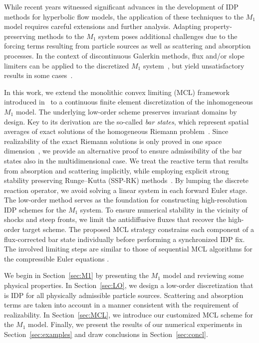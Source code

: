 \documentclass[preprint, 11pt]{elsarticle}
\begin{document}
While recent years witnessed significant advances in the development of IDP methods for hyperbolic flow models, the application of these techniques to the $M_1$ model requires careful extensions and further analysis. 
Adapting property-preserving methods to the $M_1$ system poses
additional challenges due to the forcing terms resulting from particle sources as well as scattering and absorption processes.
In the context of discontinuous Galerkin methods, flux and/or slope limiters
can be applied to the discretized
$M_1$ system~\cite{alldredge2015,chu2019,olbrant2012}, but yield unsatisfactory results in some cases~\cite{chidyagwai2018}.

In this work, we extend the monolithic convex limiting (MCL) framework
introduced in~\cite{kuzmin2020} to a continuous finite element discretization
of the inhomogeneous $M_1$ model. The underlying low-order scheme
preserves invariant domains by design.
Key to its derivation are the so-called \textit{bar states}, which represent spatial averages of exact solutions of the homogeneous Riemann problem~\cite{guermond2016}.
Since realizability of the exact Riemann solutions is only proved in one space dimension~\cite{coulombel2006}, we provide an alternative proof to ensure admissibility of the bar states also in the multidimensional case. 
We treat the reactive term that results from absorption and scattering implicitly, while employing explicit strong stability preserving Runge--Kutta (SSP-RK) methods~\cite{gottlieb2001, shu1989}. %
By lumping the discrete reaction operator, we avoid solving a linear system in each forward Euler stage.
The low-order method serves as the foundation for constructing high-resolution IDP schemes for the $M_1$ system. To ensure numerical stability in the vicinity of shocks and steep fronts, we limit the antidiffusive fluxes that recover the high-order target scheme. The proposed MCL strategy constrains each component of a flux-corrected bar state individually before performing a synchronized IDP fix. The involved limiting steps are similar to those of sequential MCL algorithms for the compressible Euler equations \cite{kuzmin2020,kuzmin2023}.

We begin in Section~\ref{sec:M1} by presenting the $M_1$ model and reviewing some physical properties. In Section~\ref{sec:LO}, we design a low-order discretization that is IDP for all physically admissible particle sources.
Scattering and absorption terms are taken into account in a manner
consistent with the requirement of realizability.
In Section~\ref{sec:MCL}, we introduce our customized MCL scheme for the $M_1$ model.
Finally, we present the results of our numerical experiments in Section~\ref{sec:examples} and draw conclusions in Section~\ref{sec:concl}.
\end{document}
